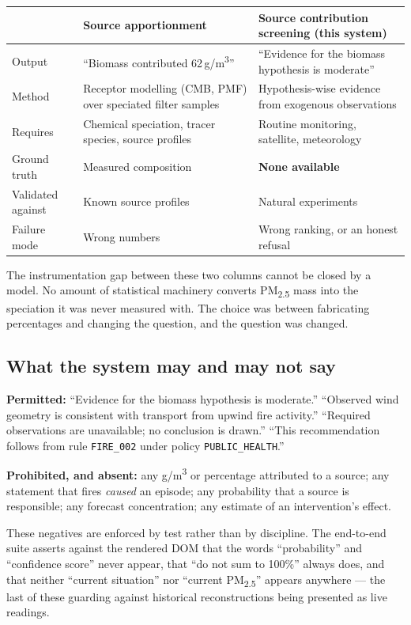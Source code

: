 \documentclass[11pt,a4paper]{article}
\newcommand{\code}[1]{\texttt{\small #1}}
\newcommand{\PM}{PM\textsubscript{2.5}}
\newcommand{\ugm}{\textmu g/m\textsuperscript{3}}
\begin{document}
\begin{center}
\small
\begin{tabularx}{\linewidth}{@{}l X X@{}}
\toprule
 & \textbf{Source apportionment} & \textbf{Source contribution screening (this system)} \\
\midrule
Output & ``Biomass contributed 62\,\ugm'' & ``Evidence for the biomass hypothesis is moderate'' \\
Method & Receptor modelling (CMB, PMF) over speciated filter samples & Hypothesis-wise evidence from exogenous observations \\
Requires & Chemical speciation, tracer species, source profiles & Routine monitoring, satellite, meteorology \\
Ground truth & Measured composition & \textbf{None available} \\
Validated against & Known source profiles & Natural experiments \\
Failure mode & Wrong numbers & Wrong ranking, or an honest refusal \\
\bottomrule
\end{tabularx}
\end{center}

The instrumentation gap between these two columns cannot be closed by a model. No
amount of statistical machinery converts \PM{} mass into the speciation it was never
measured with. The choice was between fabricating percentages and changing the
question, and the question was changed.

\subsection{What the system may and may not say}

\textbf{Permitted:} ``Evidence for the biomass hypothesis is moderate.''
``Observed wind geometry is consistent with transport from upwind fire activity.''
``Required observations are unavailable; no conclusion is drawn.''
``This recommendation follows from rule \code{FIRE\_002} under policy
\code{PUBLIC\_HEALTH}.''

\textbf{Prohibited, and absent:} any \ugm{} or percentage attributed to a source;
any statement that fires \emph{caused} an episode; any probability that a source is
responsible; any forecast concentration; any estimate of an intervention's effect.

These negatives are enforced by test rather than by discipline. The end-to-end suite
asserts against the rendered DOM that the words ``probability'' and ``confidence
score'' never appear, that ``do not sum to 100\%'' always does, and that neither
``current situation'' nor ``current \PM{}'' appears anywhere --- the last of these
guarding against historical reconstructions being presented as live readings.
\end{document}
